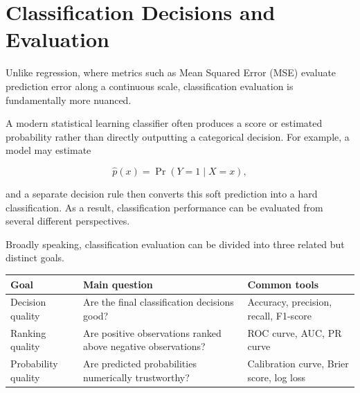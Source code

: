 \documentclass[
  letterpaper,
  DIV=11,
  numbers=noendperiod]{scrreprt}
\newcounter{none} %
\theoremstyle{definition}
\theoremstyle{definition}
\theoremstyle{plain}
\theoremstyle{plain}
\theoremstyle{remark}
\begin{document}
\chapter{Classification Decisions and
Evaluation}\label{classification-decisions-and-evaluation}

Unlike regression, where metrics such as Mean Squared Error (MSE)
evaluate prediction error along a continuous scale, classification
evaluation is fundamentally more nuanced.

A modern statistical learning classifier often produces a score or
estimated probability rather than directly outputting a categorical
decision. For example, a model may estimate

\[
\hat p(x)=\Pr(Y=1\mid X=x),
\]

and a separate decision rule then converts this soft prediction into a
hard classification. As a result, classification performance can be
evaluated from several different perspectives.

Broadly speaking, classification evaluation can be divided into three
related but distinct goals.

{\def\LTcaptype{none} %
\begin{longtable}[]{@{}
  >{\raggedright\arraybackslash}p{}
  >{\raggedright\arraybackslash}p{}
  >{\raggedright\arraybackslash}p{}@{}}
\toprule\noalign{}
\begin{minipage}[b]{\linewidth}\raggedright
Goal
\end{minipage} & \begin{minipage}[b]{\linewidth}\raggedright
Main question
\end{minipage} & \begin{minipage}[b]{\linewidth}\raggedright
Common tools
\end{minipage} \\
\midrule\noalign{}
\endhead
\bottomrule\noalign{}
\endlastfoot
Decision quality & Are the final classification decisions good? &
Accuracy, precision, recall, F1-score \\
Ranking quality & Are positive observations ranked above negative
observations? & ROC curve, AUC, PR curve \\
Probability quality & Are predicted probabilities numerically
trustworthy? & Calibration curve, Brier score, log loss \\
\end{longtable}
}
\end{document}

